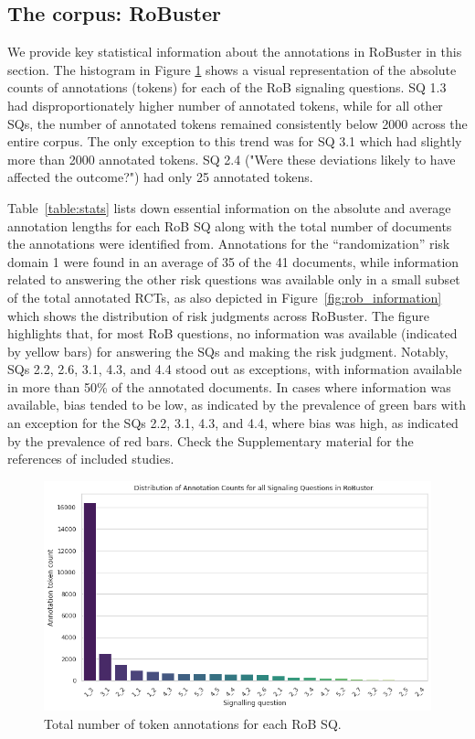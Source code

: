 \documentclass[sn-mathphys,Numbered]{sn-jnl}%
\theoremstyle{thmstyleone}%
\theoremstyle{thmstyletwo}%
\theoremstyle{thmstylethree}%
\begin{document}
\subsection{The corpus: RoBuster}
\label{subsec:corpus}
%
We provide key statistical information about the annotations in RoBuster in this section.
The histogram in Figure \ref{fig:ann_counts} shows a visual representation of the absolute counts of annotations (tokens) for each of the RoB signaling questions.
SQ 1.3 had disproportionately higher number of annotated tokens, while for all other SQs, the number of annotated tokens remained consistently below 2000 across the entire corpus.
The only exception to this trend was for SQ 3.1 which had slightly more than 2000 annotated tokens.
SQ 2.4 ("Were these deviations likely to have affected the outcome?") had only 25 annotated tokens.


Table~\ref{table:stats} lists down essential information on the absolute and average annotation lengths for each RoB SQ along with the total number of documents the annotations were identified from.
Annotations for the ``randomization'' risk domain 1 were found in an average of 35 of the 41 documents, while information related to answering the other risk questions was available only in a small subset of the total annotated RCTs, as also depicted in Figure~\ref{fig:rob_information} which shows the distribution of risk judgments across RoBuster.
The figure highlights that, for most RoB questions, no information was available (indicated by yellow bars) for answering the SQs and making the risk judgment.
Notably, SQs 2.2, 2.6, 3.1, 4.3, and 4.4 stood out as exceptions, with information available in more than 50\% of the annotated documents.
In cases where information was available, bias tended to be low, as indicated by the prevalence of green bars with an exception for the SQs 2.2, 3.1, 4.3, and 4.4, where bias was high, as indicated by the prevalence of red bars.
Check the Supplementary material for the references of included studies.
%
%
%
\begin{figure}[htb]
    \centering
    \includegraphics[width=0.90\columnwidth]{figures/annot_counts.png}
    \caption{Total number of token annotations for each RoB SQ.}
    \label{fig:ann_counts}
\end{figure}
%
%
%
\end{document}
